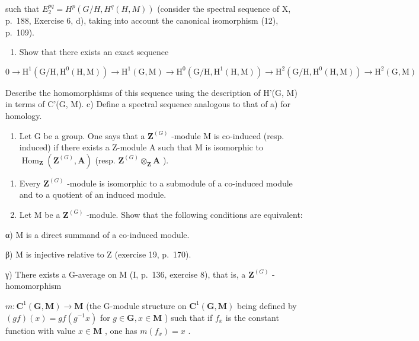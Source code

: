 such that \(E_{2}^{pq} = H^{p}(G/H, H^{q}(H, M))\) (consider the spectral sequence of X, p.~188, Exercise 6, d), taking into account the canonical isomorphism (12), p.~109).

\begin{enumerate}
\def\labelenumi{\alph{enumi})}
\setcounter{enumi}{1}
\tightlist
\item
  Show that there exists an exact sequence
\end{enumerate}

\[
0 \to \mathrm{H} ^ {1} (\mathrm{G} / \mathrm{H}, \mathrm{H} ^ {0} (\mathrm{H}, \mathrm{M})) \to \mathrm{H} ^ {1} (\mathrm{G}, \mathrm{M}) \to \mathrm{H} ^ {0} (\mathrm{G} / \mathrm{H}, \mathrm{H} ^ {1} (\mathrm{H}, \mathrm{M})) \to \mathrm{H} ^ {2} (\mathrm{G} / \mathrm{H}, \mathrm{H} ^ {0} (\mathrm{H}, \mathrm{M})) \to \mathrm{H} ^ {2} (\mathrm{G}, \mathrm{M})
\]

Describe the homomorphisms of this sequence using the description of H'(G, M) in terms of C'(G, M). c) Define a spectral sequence analogous to that of a) for homology.

\begin{enumerate}
\def\labelenumi{\arabic{enumi})}
\setcounter{enumi}{11}
\tightlist
\item
  Let G be a group. One says that a \(\mathbf{Z}^{(G)}\) -module M is co-induced (resp. induced) if there exists a Z-module A such that M is isomorphic to \(\operatorname{Hom}_{\mathbf{Z}}(\mathbf{Z}^{(G)}, \mathbf{A})\) (resp. \(\mathbf{Z}^{(G)} \otimes_{\mathbf{Z}} \mathbf{A}\) ).
\end{enumerate}

\begin{enumerate}
\def\labelenumi{\alph{enumi})}
\item
  Every \(\mathbf{Z}^{(G)}\) -module is isomorphic to a submodule of a co-induced module and to a quotient of an induced module.
\item
  Let M be a \(\mathbf{Z}^{(G)}\) -module. Show that the following conditions are equivalent:
\end{enumerate}

α) M is a direct summand of a co-induced module.

β) M is injective relative to Z (exercise 19, p.~170).

γ) There exists a G-average on M (I, p.~136, exercise 8), that is, a \(\mathbf{Z}^{(G)}\) -homomorphism

\(m: \mathbf{C}^{1}(\mathbf{G}, \mathbf{M}) \to \mathbf{M}\) (the G-module structure on \(\mathbf{C}^{1}(\mathbf{G}, \mathbf{M})\) being defined by \((gf)(x) = gf(g^{-1}x)\) for \(g \in \mathbf{G}, x \in \mathbf{M}\) ) such that if \(f_{x}\) is the constant function with value \(x \in \mathbf{M}\) , one has \(m(f_{x}) = x\) .


